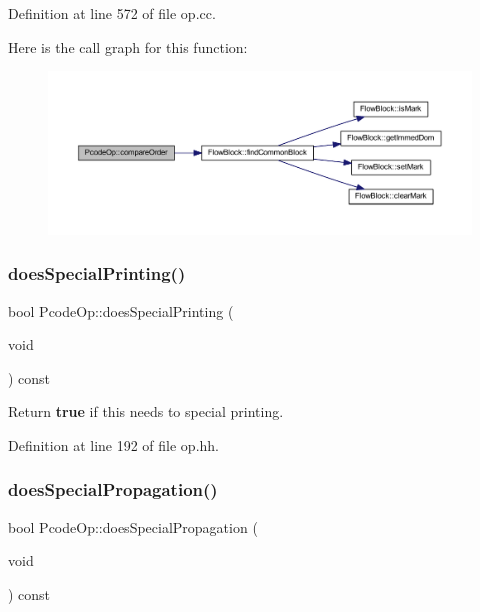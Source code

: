 Definition at line 572 of file op.\+cc.

Here is the call graph for this function\+:
\nopagebreak
\begin{figure}[H]
\begin{center}
\leavevmode
\includegraphics[width=350pt]{class_pcode_op_a9a58052af8c0272d059c44fa4172c18a_cgraph}
\end{center}
\end{figure}
\mbox{\label{class_pcode_op_a71b48612b17f981218d84fd105b42223}} 
\subsubsection{\texorpdfstring{doesSpecialPrinting()}{doesSpecialPrinting()}}
{\footnotesize\ttfamily bool Pcode\+Op\+::does\+Special\+Printing (\begin{DoxyParamCaption}\item[{void}]{ }\end{DoxyParamCaption}) const\hspace{0.3cm}{\ttfamily [inline]}}



Return {\bfseries{true}} if this needs to special printing. 



Definition at line 192 of file op.\+hh.

\mbox{\label{class_pcode_op_a746fabce57a6add33b424b291954f1f8}} 
\subsubsection{\texorpdfstring{doesSpecialPropagation()}{doesSpecialPropagation()}}
{\footnotesize\ttfamily bool Pcode\+Op\+::does\+Special\+Propagation (\begin{DoxyParamCaption}\item[{void}]{ }\end{DoxyParamCaption}) const\hspace{0.3cm}{\ttfamily [inline]}}



